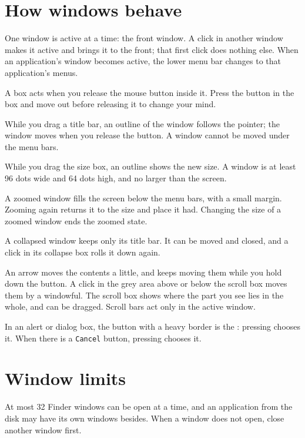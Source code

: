 \section{How windows behave}
One window is active at a time: the front
window.  A click in another window makes it active and brings it to the
front; that first click does nothing else.  When an application's window
becomes active, the lower menu bar changes to that application's menus.

A box acts when you release the mouse button inside it.
Press the button in the box and move out before releasing it to change your
mind.

While you drag a title bar, an outline of the window
follows the pointer; the window moves when you release the button.  A
window cannot be moved under the menu bars.

While you drag the size box, an outline shows the new size.
A window is at least 96 dots wide and 64 dots high, and no larger than the
screen.

A zoomed window fills the screen below the menu bars,
with a small margin.  Zooming again returns it to the size and place it
had.  Changing the size of a zoomed window ends the zoomed state.

A collapsed window keeps only its title bar.  It can
be moved and closed, and a click in its collapse box rolls it down again.

An arrow moves the contents a little, and keeps
moving them while you hold down the button.  A click in the grey area
above or below the scroll box moves them by a windowful.  The scroll box
shows where the part you see lies in the whole, and can be dragged.
Scroll bars act only in the active window.

In an alert or dialog box, the button with a heavy
border is the : pressing  chooses it.  When
there is a \texttt{Cancel} button, pressing  chooses it.

\section{Window limits}
At most 32 Finder windows can be open at a time, and an application from
the disk may have its own windows besides.  When a window does not open,
close another window first.
